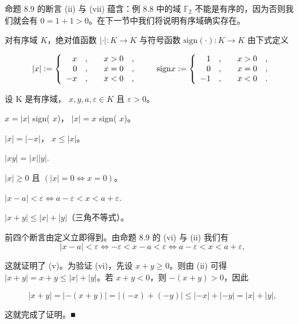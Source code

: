 命题 8.9 的断言 (ii) 与 (vii) 蕴含：例 8.8 中的域 $\mathbb{F}_2$ 不能是有序的，因为否则我们就会有 $0 = 1 + 1 > 0$。在下一节中我们将说明有序域确实存在。

对有序域 $K$，绝对值函数 $|\cdot|: K \to K$ 与符号函数 $\mathrm{sign}(\cdot): K \to K$ 由下式定义

\begin{equation*}
\left|x\right|:=\left\{\begin{array}{r l}{x\quad,\quad}&{x>0\quad,}\\ {0\quad,\quad}&{x=0\quad,}\\ {-x\quad,\quad}&{x<0\quad,}\end{array}\right.\qquad\mathrm{s i g n}x:=\left\{\begin{array}{r l}{1\quad,\quad}&{x>0\quad,}\\ {0\quad,\quad}&{x=0\quad,}\\ {-1\quad,\quad}&{x<0\quad.}\end{array}\right.
\end{equation*}

\begin{proposition}

设 K 是有序域， $ x, y, a, \varepsilon \in K $ 且  $ \varepsilon > 0 $。

\begin{subitems}
\item

$ x = |x| $ sign( $ x $)， $ |x| = x $ sign( $ x $)。

\item

$ |x| = |-x| $， $ x \leq |x| $。

\item

$ |xy| = |x| |y| $.

\item

$ |x| \geq 0 $ 且  $ (|x| = 0 \Leftrightarrow x = 0) $。

\item

$ |x - a| < \varepsilon \Leftrightarrow a - \varepsilon < x < a + \varepsilon $.

\item

$ |x + y| \leq |x| + |y| $（三角不等式）。

\proofhead
前四个断言由定义立即得到。由命题 8.9 的 (vi) 与 (ii) 我们有
\[
|x-a|<\varepsilon\Longleftrightarrow-\varepsilon<x-a<\varepsilon\Longleftrightarrow a-\varepsilon<x<a+\varepsilon,
\]

这就证明了 (v)。为验证 (vi)，先设 $x + y \geq 0$。则由 (ii) 可得 $|x + y| = x + y \leq |x| + |y|$。若 $x + y < 0$，则 $-(x + y) > 0$，因此

\[
|x+y|=|-(x+y)|=|(-x)+(-y)|\leq|-x|+|-y|=|x|+|y|,
\]

这就完成了证明。■

\end{subitems}

\end{proposition}

